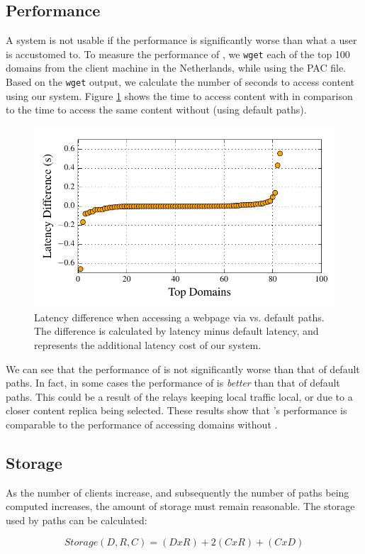 \subsection{Performance}
A system is not usable if the performance is significantly worse than what a user
is accustomed to.  To measure the performance of \system{}, we {\tt wget} each 
of the top 100 domains from the client machine in the Netherlands, while 
using the PAC file.  Based on the {\tt wget} output, we calculate the number 
of seconds to access content using our system. Figure \ref{fig:latency} shows 
the time to access content with \system{} in comparison to the time to access the 
same content without \system{} (using default paths).  

\begin{figure}[t]
\centering
\includegraphics[width=.5\textwidth]{latency}
\caption{Latency difference when accessing a webpage via \system{} vs. default paths. 
The difference is calculated by \system{} latency minus default latency, and represents 
the additional latency cost of our system.}
\label{fig:latency}
\end{figure}

We can see that the performance of \system{} is not significantly worse than that 
of default paths.  In fact, in some cases the performance of \system{} is {\it 
better} than that of default paths.  This could be a result of the relays 
keeping local traffic local, or due to a closer content replica being selected. 
These results show that \system{}'s performance is comparable to the performance 
of accessing domains without \system{}.

\subsection{Storage}
As the number of clients increase, and subsequently the number of paths being 
computed increases, the amount of storage must remain reasonable.  The storage 
used by paths can be calculated:

\[Storage(D,R,C) = (D x R) + 2(C x R) + (C x D) \]

